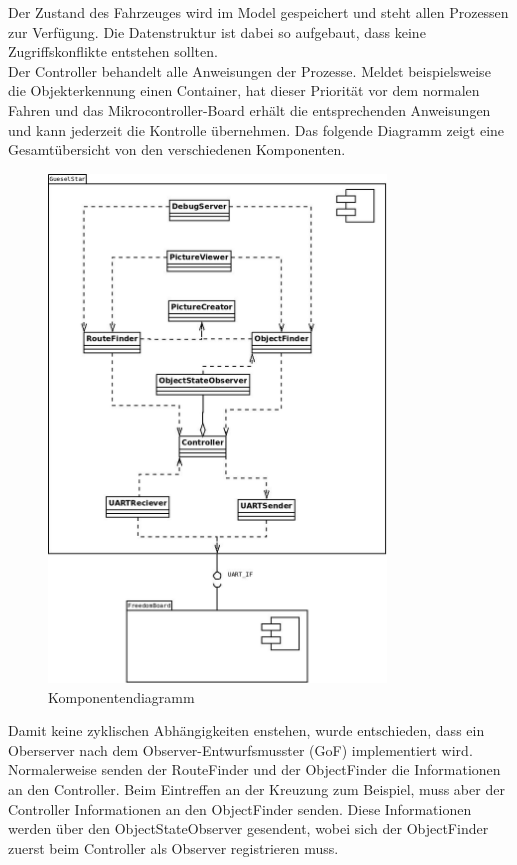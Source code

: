Der Zustand des Fahrzeuges wird im Model gespeichert und steht allen Prozessen zur Verfügung. Die Datenstruktur ist dabei so aufgebaut, dass keine Zugriffskonflikte entstehen sollten.\\
Der Controller behandelt alle Anweisungen der Prozesse. Meldet beispielsweise die Objekterkennung einen Container, hat dieser Priorität vor dem normalen Fahren und das Mikrocontroller-Board erhält die entsprechenden Anweisungen und kann jederzeit die Kontrolle übernehmen. Das folgende Diagramm zeigt eine Gesamtübersicht von den verschiedenen Komponenten.\\[0.2cm]
\begin{figure}[H]
\centering
\includegraphics[width=0.8\textwidth]{03_Loesungskonzept/pictures/Komponentendiagramm_detailliert_v2.jpeg}
\caption{Komponentendiagramm}
\end{figure}
Damit keine zyklischen Abhängigkeiten enstehen, wurde entschieden, dass ein Oberserver nach dem Observer-Entwurfsmusster (GoF) implementiert wird. Normalerweise senden der RouteFinder und der ObjectFinder die Informationen an den Controller. Beim Eintreffen an der Kreuzung zum Beispiel, muss aber der Controller Informationen an den ObjectFinder senden. Diese Informationen werden über den ObjectStateObserver gesendent, wobei sich der ObjectFinder zuerst beim Controller als Observer registrieren muss.

